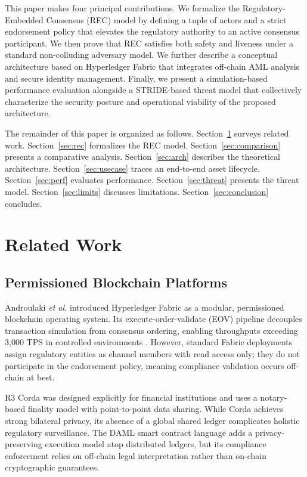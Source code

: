 \documentclass[journal,10pt,twocolumn]{IEEEtran}
\begin{document}
This paper makes four principal contributions. We formalize the Regulatory-Embedded Consensus (REC) model by defining a tuple of actors and a strict endorsement policy that elevates the regulatory authority to an active consensus participant. We then prove that REC satisfies both safety and liveness under a standard non-colluding adversary model. We further describe a conceptual architecture based on Hyperledger Fabric that integrates off-chain AML analysis and secure identity management. Finally, we present a simulation-based performance evaluation alongside a STRIDE-based threat model that collectively characterize the security posture and operational viability of the proposed architecture.

The remainder of this paper is organized as follows. Section~\ref{sec:related} surveys related work. Section~\ref{sec:rec} formalizes the REC model. Section~\ref{sec:comparison} presents a comparative analysis. Section~\ref{sec:arch} describes the theoretical architecture. Section~\ref{sec:usecase} traces an end-to-end asset lifecycle. Section~\ref{sec:perf} evaluates performance. Section~\ref{sec:threat} presents the threat model. Section~\ref{sec:limits} discusses limitations. Section~\ref{sec:conclusion} concludes.

\section{Related Work}
\label{sec:related}

\subsection{Permissioned Blockchain Platforms}

Androulaki \textit{et al.} \cite{ref:fabric} introduced Hyperledger Fabric as a modular, permissioned blockchain operating system. Its execute-order-validate (EOV) pipeline decouples transaction simulation from consensus ordering, enabling throughputs exceeding 3,000 TPS in controlled environments \cite{ref:manevich}. However, standard Fabric deployments assign regulatory entities as channel members with read access only; they do not participate in the endorsement policy, meaning compliance validation occurs off-chain at best.

R3 Corda \cite{ref:corda} was designed explicitly for financial institutions and uses a notary-based finality model with point-to-point data sharing. While Corda achieves strong bilateral privacy, its absence of a global shared ledger complicates holistic regulatory surveillance. The DAML smart contract language \cite{ref:daml} adds a privacy-preserving execution model atop distributed ledgers, but its compliance enforcement relies on off-chain legal interpretation rather than on-chain cryptographic guarantees.
\end{document}
